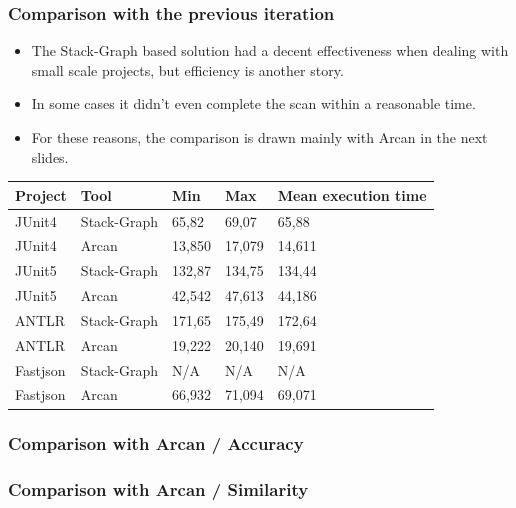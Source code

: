 \documentclass[dvipsnames, 10pt, table]{beamer}
\begin{document}
\begin{frame}
  \frametitle{Comparison with the previous iteration}

  \begin{block}{}
    \begin{itemize}
      \item The Stack-Graph based solution had a decent effectiveness when dealing with small scale projects, but efficiency is another story.
      \item In some cases it didn't even complete the scan within a reasonable time.
      \item For these reasons, the comparison is drawn mainly with Arcan in the next slides.
    \end{itemize}
  \end{block}
  
  \center
  \begin{tabular}{|l|l|l|l|l|}
      \hline
      \textbf{Project} & \textbf{Tool} & \textbf{Min} & \textbf{Max} & \textbf{Mean execution time} \\ \hline
      \hline
      \rowcolor[HTML]{EED49F} 
      JUnit4   & Stack-Graph & 65,82  & 69,07  & 65,88     \\ \hline
      \rowcolor[HTML]{A6DA95} 
      JUnit4   & Arcan     & 13,850 & 17,079 & 14,611    \\ \hline
      \rowcolor[HTML]{EED49F} 
      JUnit5   & Stack-Graph & 132,87 & 134,75 & 134,44    \\ \hline
      \rowcolor[HTML]{A6DA95} 
      JUnit5   & Arcan     & 42,542 & 47,613 & 44,186    \\ \hline
      \rowcolor[HTML]{EED49F} 
      ANTLR    & Stack-Graph & 171,65 & 175,49 & 172,64    \\ \hline
      \rowcolor[HTML]{A6DA95} 
      ANTLR    & Arcan     & 19,222 & 20,140 & 19,691    \\ \hline
      \rowcolor[HTML]{ED8796} 
      Fastjson & Stack-Graph & N/A    & N/A    & N/A       \\ \hline
      \rowcolor[HTML]{A6DA95} 
      Fastjson & Arcan     & 66,932 & 71,094 & 69,071    \\ \hline
  \end{tabular}
\end{frame}

\begin{frame}
  \frametitle{Comparison with Arcan / Accuracy}
\end{frame}

\begin{frame}
  \frametitle{Comparison with Arcan / Similarity}
\end{frame}
\end{document}
